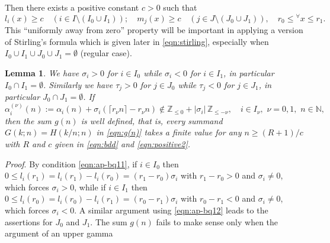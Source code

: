 \documentclass[a4paper,12pt]{article}
\theoremstyle{plain}
\newtheorem{lemma}[theorem]{Lemma}
\def\N{\mathbb{N}}
\def\Z{\mathbb{Z}}
\begin{document}
Then there exists a positive constant $c > 0$ such that 
\begin{equation} \label{eqn:positive2}
l_i(x) \ge c \quad (i \in I \setminus (I_0 \cup I_1)); \quad 
m_j(x) \ge c \quad (j \in J \setminus (J_0 \cup J_1)), 
\quad r_0 \le {}^{\forall} x  \le r_1.  
\end{equation}  
This ``uniformly away from zero'' property will be important in applying a version 
of Stirling's formula which is given later in \eqref{eqn:stirling}, especially when 
$I_0 \cup I_1 \cup J_0 \cup J_1 = \emptyset$ (regular case).      
\begin{lemma} \label{lem:I0I1}  We have $\sigma_i > 0$ for $i \in I_0$ while 
$\sigma_i < 0$ for $i \in I_1$, in particular  $I_0 \cap I_1 = \emptyset$. 
Similarly we have $\tau_j > 0$ for $j \in J_0$ while $\tau_j < 0$ for $j \in J_1$, 
in particular  $J_0 \cap J_1 = \emptyset$. 
If  
\begin{equation} \label{eqn:punc0}
\alpha^{(\nu)}_i(n) := \alpha_i(n) + \sigma_i (\lceil r_{\nu} n \rceil - r_{\nu} n ) 
\not \in \Z_{\le 0}  + |\sigma_i| \, \Z_{\le -\nu}, 
\quad  i \in I_{\nu}, \,\,  \nu = 0, 1, \,\, n \in \N,     
\end{equation}
then the sum $g(n)$ is well defined, that is, every summand 
$G(k; n) = H(k/n; n)$ in \eqref{eqn:g(n)} takes a finite value for any 
$n \ge (R+1)/c$ with $R$ and $c$ given in \eqref{eqn:bdd} and 
\eqref{eqn:positive2}.      
\end{lemma} 
{\it Proof}. 
By condition \eqref{eqn:ap-bq11}, if $i \in I_0$ then $0 \le l_i( r_1 ) = l_i( r_1 ) - 
l_i( r_0 ) = (r_1-r_0) \sigma_i$ with $r_1-r_0 > 0$ and $\sigma_i \neq 0$, 
which forces $\sigma_i > 0$, while if $i \in I_1$ then  $0 \le l_i( r_0 ) = l_i( r_0 ) - 
l_i( r_1 ) = (r_0-r_1) \sigma_i$ with $r_0-r_1 < 0$ and $\sigma_i \neq 0$, 
which forces $\sigma_i < 0$.  
A similar argument using \eqref{eqn:ap-bq12} leads to the assertions for 
$J_0$ and $J_1$.   
The sum $g(n)$ fails to make sense only when the argument of an upper gamma 
\end{document}
